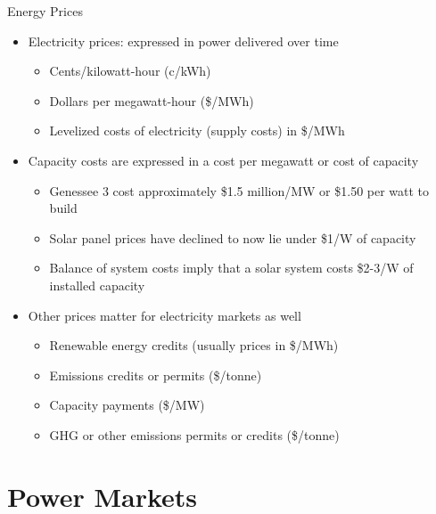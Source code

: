 \documentclass[aspectratio=169]{beamer}
\renewcommand{\(}{\begin{columns}}
\renewcommand{\)}{\end{columns}}
\newcommand{\<}[1]{\begin{column}{#1}}
\renewcommand{\>}{\end{column}}
\begin{document}
\begin{frame}{Energy Prices}
\begin{itemize}
\setlength\itemsep{.25em}
\item Electricity prices: expressed in power delivered over time
\begin{itemize}
\setlength\itemsep{.15em}
\item Cents/kilowatt-hour (c/kWh)
\item Dollars per megawatt-hour (\$/MWh)
\item Levelized costs of electricity (supply costs) in \$/MWh
\end{itemize}

\item Capacity costs are expressed in a cost per megawatt or cost of capacity
\begin{itemize}
\setlength\itemsep{.15em}
\item Genessee 3 cost approximately \$1.5 million/MW or \$1.50 per watt to build
\item Solar panel prices have declined to now lie under \$1/W of capacity
\item Balance of system costs imply that a solar system costs \$2-3/W of installed capacity
\end{itemize}
\item Other prices matter for electricity markets as well
\begin{itemize}
\setlength\itemsep{.15em}
\item Renewable energy credits (usually prices in \$/MWh)
\item Emissions credits or permits (\$/tonne)
\item Capacity payments (\$/MW)
\item GHG or other emissions permits or credits (\$/tonne)
\end{itemize}
\end{itemize}

\vfill \end{frame}


\section{Power Markets}
\end{document}
